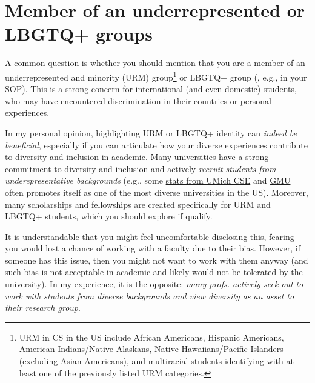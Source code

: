 \documentclass[oneside,11pt,dvipsnames]{book}
\begin{document}

\section{Member of an underrepresented or LBGTQ+ groups}\label{sec:urm}
A common question is whether you should mention that you are a member of an underrepresented and minority (URM) group\footnote{URM in CS in the US include African Americans, Hispanic Americans, American Indians/Native Alaskans, Native Hawaiians/Pacific Islanders (excluding Asian Americans), and multiracial students identifying with at least one of the previously listed URM categories.} or LBGTQ+ group (, e.g., in your SOP).
This is a strong concern for international (and even domestic) students, who may have encountered discrimination in their countries or personal experiences.

In my personal opinion, highlighting URM or LBGTQ+ identity can \emph{indeed be beneficial}, especially if you can articulate how your diverse experiences contribute to diversity and inclusion in academic.  Many universities have a strong commitment to diversity and inclusion and actively
\emph{recruit students from underepresentative backgrounds} (e.g., some \href{https://cse-climate.engin.umich.edu/reports/climate-dei-reports/cse-climate-and-dei-report-2022-2023/#grad-ethnicity}{stats from UMich CSE} and \href{https://www.gmu.edu/news/2022-09/mason-now-top-10-public-university-diversity-innovation-and-cybersecurity-education-us}{GMU} often promotes itself as one of the most diverse universities in the US). Moreover, many scholarships and fellowships are created specifically for URM and LBGTQ+ students, which you should explore if qualify.

It is understandable that you might feel uncomfortable disclosing this, fearing you would lost a chance of working with a faculty due to their bias.  However, if someone has this issue, then you might not want to work with them anyway (and such bias is not acceptable in academic and likely would not be tolerated by the university). In my experience, it is the opposite: \emph{many profs. actively seek out to work with students from diverse backgrounds and view diversity as an asset to their research group}.
\end{document}
